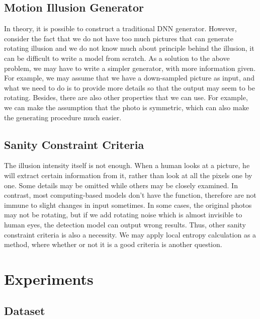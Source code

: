 \documentclass[journal]{IEEEtran}
\begin{document}
  \subsection{Motion Illusion Generator}
  \label{sec:generation_generator}
  
  In theory, it is possible to construct a traditional DNN generator. However, consider the fact that we do not have too much pictures that can generate rotating illusion and we do not know much about principle behind the illusion, it can be difficult to write a model from scratch.
  As a solution to the above problem, we may have to write a simpler generator, with more information given. For example, we may assume that we have a down-sampled picture as input, and what we need to do is to provide more details so that the output may seem to be rotating. Besides, there are also other properties that we can use. For example, we can make the assumption that the photo is symmetric, which can also make the generating procedure much easier.
  
  \subsection{Sanity Constraint Criteria}
  \label{sec:generation_criteria}
  
  The illusion intensity itself is not enough. When a human looks at a picture, he will extract certain information from it, rather than look at all the pixels one by one. Some details may be omitted while others may be closely examined. In contrast, most computing-based models don't have the function, therefore are not immune to slight changes in input sometimes. In some cases, the original photos may not be rotating, but if we add rotating noise which is almost invisible to human eyes, the detection model can output wrong results. Thus, other sanity constraint criteria is also a necessity. We may apply local entropy calculation as a method, where whether or not it is a good criteria is another question. 
  
  
  \section{Experiments}
  \label{sec:experiments}
  
  \subsection{Dataset}
  
\end{document}
